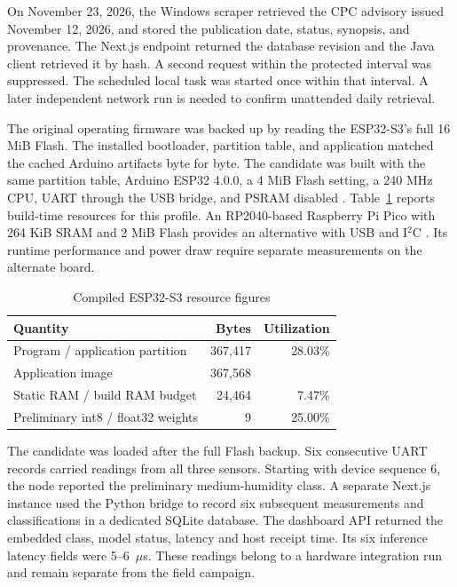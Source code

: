 \documentclass[conference]{IEEEtran}
\begin{document}
On November 23, 2026, the Windows scraper retrieved the CPC advisory issued November 12, 2026, and stored the publication date, status, synopsis, and provenance. The Next.js endpoint returned the database revision and the Java client retrieved it by hash. A second request within the protected interval was suppressed. The scheduled local task was started once within that interval. A later independent network run is needed to confirm unattended daily retrieval.

The original operating firmware was backed up by reading the ESP32-S3's full 16 MiB Flash. The installed bootloader, partition table, and application matched the cached Arduino artifacts byte for byte. The candidate was built with the same partition table, Arduino ESP32 4.0.0, a 4 MiB Flash setting, a 240 MHz CPU, UART through the USB bridge, and PSRAM disabled \cite{esp}. Table~\ref{tab:build} reports build-time resources for this profile. An RP2040-based Raspberry Pi Pico with 264 KiB SRAM and 2 MiB Flash provides an alternative with USB and I$^2$C \cite{pico}. Its runtime performance and power draw require separate measurements on the alternate board.

\begin{table}[ht]
\centering
\caption{Compiled ESP32-S3 resource figures}
\label{tab:build}
\begin{tabular}{lrr}
\hline
Quantity & Bytes & Utilization \\
\hline
Program / application partition & 367,417 & 28.03\% \\
Application image & 367,568 & {} \\
Static RAM / build RAM budget & 24,464 & 7.47\% \\
Preliminary int8 / float32 weights & 9 & 25.00\% \\
\hline
\end{tabular}
\end{table}

The candidate was loaded after the full Flash backup. Six consecutive UART records carried readings from all three sensors. Starting with device sequence 6, the node reported the preliminary medium-humidity class. A separate Next.js instance used the Python bridge to record six subsequent measurements and classifications in a dedicated SQLite database. The dashboard API returned the embedded class, model status, latency and host receipt time. Its six inference latency fields were 5--6~$\mu$s. These readings belong to a hardware integration run and remain separate from the field campaign.
\end{document}
